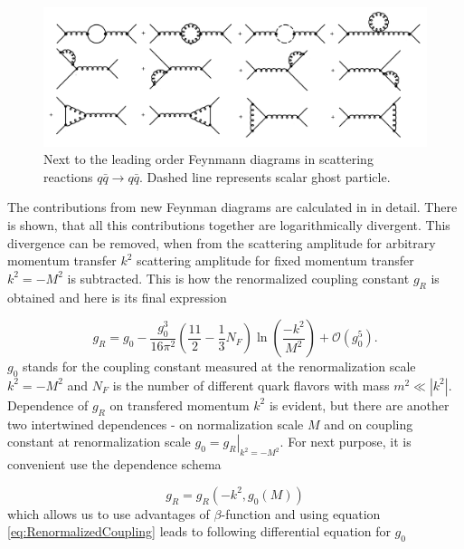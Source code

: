 \documentclass[a4paper,11pt]{report}
\begin{document}
\begin{figure}[t]
  \centering
  \includegraphics[width=\textwidth]{Chapter1/QuarkQuarkCorrection.png} 
  \caption{Next to the leading order Feynmann diagrams in scattering reactions
    $q \bar{q} \rightarrow q \bar{q}$. Dashed line represents scalar ghost
  particle.}
  \label{fig:QuarkQuarkScatteringCorrection}
\end{figure}

The contributions from new Feynman diagrams are calculated in \cite{QCDTextbook}
in detail. There is shown, that all this contributions together are
logarithmically divergent. This divergence can be removed, when from the scattering
amplitude for arbitrary momentum transfer $k^2$ scattering amplitude for fixed
momentum transfer $k^2 = -M^2$ is subtracted. This is how the renormalized
coupling constant $g_R$ is obtained and here is its final expression 

\begin{equation}
  g_R = g_0 - \frac{g_0^3}{16\pi^2} \left( \frac{11}{2} - \frac{1}{3}N_F \right)
  \ln \left( \frac{-k^2}{M^2} \right) + \mathscr{O}(g_0^5).
  \label{eq:RenormalizedCoupling}
\end{equation}
$g_0$ stands for the coupling constant measured at the renormalization scale
$k^2 = -M^2$ and $N_F$ is the number of different quark flavors with mass $m^2
\ll \left| k^2 \right|$. Dependence of $g_R$ on transfered momentum $k^2$ is
evident, but there are another two intertwined dependences - on normalization
scale $M$ and on coupling constant at renormalization scale $g_0 =
\left. g_R \right|_{k^2=-M^2}$. For next purpose, it is convenient use the dependence schema

\begin{equation}
  g_R = g_R(-k^2,g_0(M))
  \label{eq:RunningCouplingConstantDependenceSchema}
\end{equation}
which allows us to use advantages of $\beta$-function and using equation
\ref{eq:RenormalizedCoupling} leads to following differential equation for $g_0$
\end{document}
